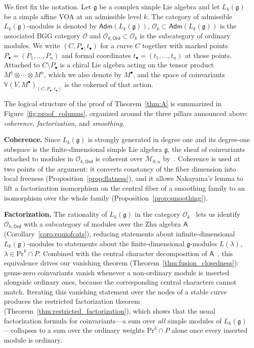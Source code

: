 \documentclass[12pt,a4paper,reqno]{amsart}
\numberwithin{equation}{section}
\theoremstyle{definition}
\newcommand{\g}{\mathfrak{g}}
\newcommand{\M}{\mathcal{M}}
\def\O{\mathcal{O}}
\def\Ord{\mathsf{Ord}}
\def\Adm{\mathsf{Adm}}
\def\Pr{\mathrm{Pr}}
\def\la{\lambda}
\def\A{\mathsf{A}}
\def\VV{\mathbb{V}}
\begin{document}
We first fix the notation. Let $\g$ be a complex simple Lie algebra and let $L_k(\g)$ be a simple affine VOA at an admissible level $k$. The category of admissible $L_k(\g)$-modules is denoted by $\Adm(L_k(\g))$, $\O_k\subset \Adm(L_k(\g))$ is the associated BGG category $\O$ \cite{A16} and $\O_{k,\Ord}\subset \O_k$ is the subcategory of ordinary modules. We write $(C,P_\bullet,t_\bullet)$ for a curve $C$ together with marked points $P_\bullet = (P_1, \dots, P_n)$ and formal coordinates $t_\bullet = (t_1, \dots, t_n)$ at those points. Attached to $C\setminus P_\bullet$ is a chiral Lie algebra acting on the tensor product $M^1\otimes\cdots\otimes M^n$, which we also denote by $M^\bullet$, and the space of coinvariants $\VV(V,M^\bullet)_{(C,P_\bullet,t_\bullet)}$ is the cokernel of that action.

The logical structure of the proof of Theorem~\ref{thm:A} is summarized in Figure~\ref{fig:proof_columns}, organized around the three pillars announced above: \emph{coherence}, \emph{factorization}, and \emph{smoothing}.

\textbf{Coherence.} Since $L_k(\g)$ is strongly generated in degree one and its degree-one subspace is the finite-dimensional simple Lie algebra $\g$, the sheaf of coinvariants attached to modules in $\O_{k,\Ord}$ is coherent over $\overline{\M}_{0,n}$ by~\cite[Corollary A]{DG}. Coherence is used at two points of the argument: it converts constancy of the fiber dimension into local freeness (Proposition~\ref{prop:flatness}), and it allows Nakayama's lemma to lift a factorization isomorphism on the central fiber of a smoothing family to an isomorphism over the whole family (Proposition~\ref{prop:smoothing}).

\textbf{Factorization.} The rationality of $L_k(\g)$ in the category $\O_k$~\cite[Main theorem]{A16} lets us identify $\O_{k,\Ord}$ with a subcategory of modules over the Zhu algebra $\A$ (Corollary~\ref{coro:equiofcats}), reducing statements about infinite-dimensional $L_k(\g)$-modules to statements about the finite-dimensional $\g$-modules $L(\la)$, $\la \in \Pr^k \cap P$. Combined with the central character decomposition of $\A$~\cite[Theorem 3.4]{AvE}, this equivalence drives our vanishing theorem (Theorem~\ref{thm:fusion_closedness}): genus-zero coinvariants vanish whenever a non-ordinary module is inserted alongside ordinary ones, because the corresponding central characters cannot match. Iterating this vanishing statement over the nodes of a stable curve produces the restricted factorization theorem (Theorem~\ref{thm:restricted_factorization}), which shows that the usual factorization formula for coinvariants---a sum over \emph{all} simple modules of $L_k(\g)$---collapses to a sum over the ordinary weights $\Pr^k \cap P$ alone once every inserted module is ordinary.
\end{document}
